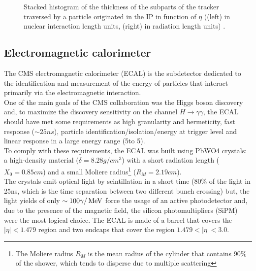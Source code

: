 \begin{figure}[H]
\begin{minipage}{\linewidth}
\begin{minipage}{0.43\linewidth}
\end{minipage}
\caption[AAA]{Stacked histogram of the thickness of the subparts of the tracker traversed by a particle originated in the IP in function of $\eta$ ((left) in nuclear interaction length units\footnotemark, (right) in radiation length units)  \cite{TrackerMaterialBudgetplotsTWiki}.}
\end{minipage}
\end{figure}



\subsection{Electromagnetic calorimeter}
The CMS electromagnetic calorimeter (ECAL) \cite{HoferETHZurichHansHofer1997TheReport,Biino2015TheProjections} is the subdetector dedicated to the identification and measurement of the energy of particles that interact primarily via the electromagnetic interaction.\\
One of the main goals of the CMS collaboration was the Higgs boson discovery and, to maximize the discovery sensitivity on the channel $H \to \gamma \gamma$, the ECAL should have met some requirements as high granularity and hermeticity, fast response ($\sim 25ns$), particle identification/isolation/energy at trigger level and linear response in a large energy range (5\GeV to 5\TeV).\\


To comply with these requirements, the ECAL was built using PbWO4 crystals: a high-density material ($\delta=8.28g/cm^3$) with a short radiation length ($X_0=0.85cm$) and a small Moliere radius\footnote{The Moliere radius $R_M$ is the mean radius of the cylinder that contains 90\% of the shower, which tends to disperse due to multiple scattering} ($R_M=2.19cm$).\\
The crystals emit optical light by scintillation in a short time (80\% of the light in 25ns, which is the time separation between two different bunch crossing) but, the light yields of only $\sim 100 \gamma/{\,\text{Me\hspace{-.08em}V}}$ force the usage of an active photodetector and, due to the presence of the magnetic field, the silicon photomultipliers (SiPM) were the most logical choice.
The ECAL is made of a barrel that covers the $|\eta|<1.479$ region and two endcaps that cover the region $1.479<|\eta|<3.0$.

